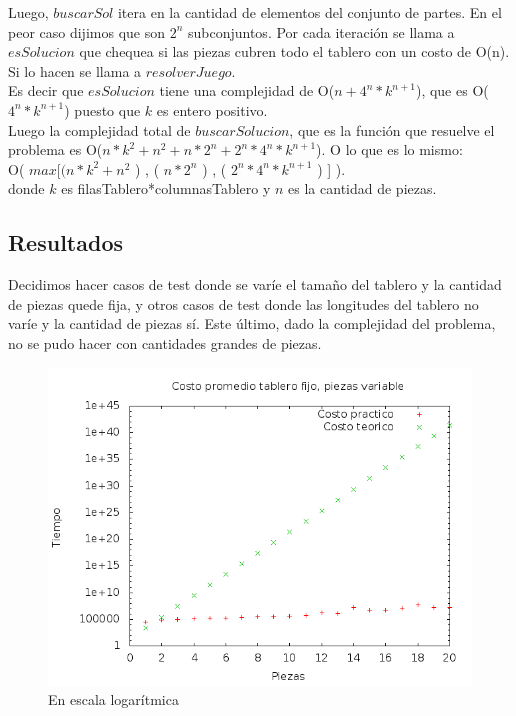 \indent Luego, $buscarSol$ itera en la cantidad de elementos del conjunto de partes. En el peor caso dijimos que son $2^{n}$ subconjuntos. Por cada iteración se llama a $esSolucion$ que chequea si las piezas cubren todo el tablero con un costo de O(n). Si lo hacen se llama a $resolverJuego$.\\

\indent Es decir que $esSolucion$ tiene una complejidad de O($n + 4^{n}*k^{n+1}$), que es O($4^{n}*k^{n+1}$) puesto que $k$ es entero positivo.\\

\indent Luego la complejidad total de $buscarSolucion$, que es la función que resuelve el problema es O($n* k^{2} + n^{2} + n * 2^{n} + 2^{n}*4^{n}*k^{n+1}$). O lo que es lo mismo:\\

\indent O( $max [(n* k^{2} + n^{2}$ ) , ( $n * 2^{n}$ ) , ( $ 2^{n}* 4^{n}*k^{n+1}$ ) ] ).\\
 
\indent donde $k$ es filasTablero*columnasTablero y $n$ es la cantidad de piezas.\\
 

\subsection{Resultados}

\quad Decidimos hacer casos de test donde se var\'ie el tama\~no del tablero y la cantidad de piezas quede fija, y otros casos de test donde las longitudes del tablero no var\'ie y la cantidad de piezas s\'i. Este \'ultimo, dado la complejidad del problema, no se pudo hacer con cantidades grandes de piezas. 

\begin{figure}[H]
	\centering
	\includegraphics[scale=0.6]{ej4-grafico1.png}
	\caption{ En escala logar\'itmica}
\end{figure}

